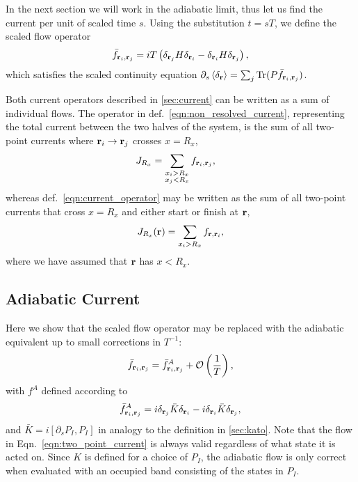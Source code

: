 In the next section we will work in the adiabatic limit, thus let us find the current per unit of scaled time $s$. Using the substitution $t = sT$, we define the scaled flow operator
\begin{align}
    \bar f_{\textbf r_i,\textbf r_j} = iT \left (\delta_{\textbf r_j}H\delta_{\textbf r_i }-\delta_{\textbf r_i}H\delta_{ \textbf r_j }\right ),
\end{align}
which satisfies the scaled continuity equation $\partial_s \left \langle \delta_{\textbf r} \right \rangle = \sum_j \textup{Tr} (P \bar f_{\textbf r_i,\textbf r_j})$.

Both current operators described in \textsection\ref{sec:current} can be written as a sum of individual flows. The operator in def.~\ref{eqn:non_resolved_current}, representing the total current between the two halves of the system, is the sum of all two-point currents where $\textbf r_i \rightarrow \textbf r_j$ crosses $x = R_x$,
\begin{align}
    J_{R_x} &= \sum_{\substack{x_i > R_x \\ x_j < R_x} } f_{\textbf r_i,\textbf r_j},
\end{align}
whereas def.~\ref{eqn:current_operator} may be written as the sum of all two-point currents that cross $x = R_x$ and either start or finish at $\textbf r$,
\begin{align}
    J_{R_x}(\textbf r) = \sum_{x_i > R_x} f_{\textbf r, \textbf r_i},
\end{align}
where we have assumed that $\textbf r$ has $x<R_x$.

\subsection{Adiabatic Current}

Here we show that the scaled flow operator may be replaced with the adiabatic equivalent up to small corrections in $T^{-1}$:
\begin{align}
    \bar f_{\textbf r_i, \textbf r_j} = \bar f_{\textbf r_i,\textbf r_j}^A + \mathcal{O} \left ( \frac{1}{T} \right),
\end{align}
with $f^A$ defined according to
\begin{align}\label{eqn:adiabatic_current}
        \bar f_{\textbf r_i,\textbf r_j}^A = i \delta_{\textbf r_j} \bar K\delta_{\textbf r_i }-i\delta_{\textbf r_i}\bar K\delta_{ \textbf r_j },
\end{align}
and $\bar K = i[\partial_s P_I , P_I] $ in analogy to the definition in \textsection\ref{sec:kato}. Note that the flow in Eqn.~\ref{eqn:two_point_current} is always valid regardless of what state it is acted on. Since $K$ is defined for a choice of $P_I$, the adiabatic flow is only correct when evaluated with an occupied band consisting of the states in $P_I$.

